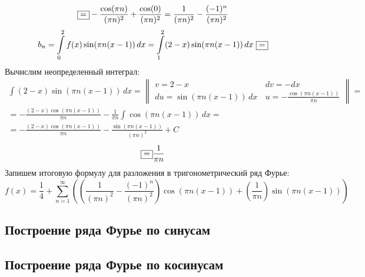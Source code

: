 \documentclass[a5paper, 10pt]{article}
\theoremstyle{definition}
\theoremstyle{plain}
\theoremstyle{remark}
\begin{document}
\begin{equation*}
\fbox{=} -  \frac{\cos (\pi n)}{(\pi n)^2} + \frac{\cos (0)}{(\pi n)^2} = \frac{1}{(\pi n)^2} -  \frac{(-1)^n}{(\pi n)^2}
\end{equation*}
\begin{equation*}
b_n  = \int \limits_{0}^{2} f(x) \sin(\pi n(x-1)) \, dx  =  \int \limits_{1}^{2} (2-x) \sin(\pi n(x-1)) \, dx \, \, \fbox{=}
\end{equation*}
Вычислим неопределенный интеграл:
\begin{multline*}
 \int  (2-x) \sin(\pi n(x-1)) \, dx = 
\begin{Vmatrix}
v = 2-x \, & dv = -dx\\
du = \sin(\pi n(x-1)) \, dx \, & u = -\frac{\cos(\pi n(x-1))}{\pi n}
\end{Vmatrix}
= \\ =  - \frac{(2-x) \cos(\pi n(x-1))}{\pi n} - \frac{1}{\pi n} \int \cos(\pi n(x-1)) \, dx = \\=
 -\frac{(2-x) \cos(\pi n(x-1))}{\pi n} -  \frac{\sin (\pi n(x-1))}{(\pi n)^2} + C
\end{multline*}
\begin{equation*}
\fbox{=} \frac{1}{\pi n}
\end{equation*}
Запишем итоговую формулу для разложения в тригонометрический ряд Фурье:
\begin{equation*}
f (x) = \frac{1}{4} + \sum \limits_{n = 1}^{\infty} \left( \left( \frac{1}{(\pi n)^2} -  \frac{(-1)^n}{(\pi n)^2}  \right) \cos(\pi n(x-1)) +  \left( \frac{1}{\pi n} \right) \sin(\pi n(x-1)) \right)
\end{equation*}


\newpage
\subsection{Построение ряда Фурье по синусам}


\newpage
\subsection{Построение ряда Фурье по косинусам}
\end{document}
